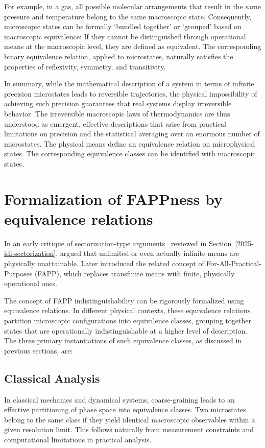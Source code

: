 \documentclass[shortAfour,sageh,times]{sagej}
\begin{document}
For example, in a gas, all possible molecular arrangements that result in the same pressure and temperature belong to the same macroscopic state.
Consequently, microscopic states can be formally `bundled together' or `grouped' based on macroscopic equivalence:
If they cannot be distinguished through operational means at the macroscopic level, they are defined as equivalent.
The corresponding binary equivalence relation, applied to microstates, naturally satisfies the properties of reflexivity, symmetry, and transitivity.



In summary, while the mathematical description of a system in terms of infinite precision microstates leads to reversible trajectories, the physical impossibility of achieving such precision guarantees that real systems display irreversible behavior.
The irreversible macroscopic laws of thermodynamics are thus understood as emergent, effective descriptions that arise from practical limitations on precision and the statistical averaging over an enormous number of microstates.
The physical means define an equivalence relation on microphysical states. The corresponding equivalence classes can be identified with macroscopic states.



\section{Formalization of FAPPness by equivalence relations}


In an early critique of sectorization-type arguments~\citep{hepp-1972,bub-2015} reviewed in Section~\ref{2025-idi-sectorization}, \cite{Bell-1975} argued that unlimited or even actually infinite means are physically unattainable.
Later \cite{bell-a} introduced the related concept of For-All-Practical-Purposes (FAPP),
which replaces transfinite means with finite, physically operational ones.

The concept of FAPP indistinguishability can be rigorously formalized using equivalence relations. In different physical contexts, these equivalence relations partition microscopic configurations into equivalence classes, grouping together states that are operationally indistinguishable at a higher level of description. The three primary instantiations of such equivalence classes, as discussed in previous sections, are:

\subsection{Classical Analysis}
In classical mechanics and dynamical systems, coarse-graining leads to an effective partitioning of phase space into equivalence classes. Two microstates belong to the same class if they yield identical macroscopic observables within a given resolution limit. This follows naturally from measurement constraints and computational limitations in practical analysis.
\end{document}
